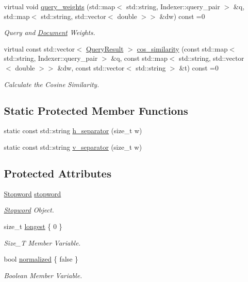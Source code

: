 \begin{DoxyCompactItemize}
virtual void \hyperlink{class_indexer_a74819336b6d9883483c09349ebdf43b8}{query\+\_\+weights} (std\+::map$<$ std\+::string, Indexer\+::query\+\_\+pair $>$ \&q, std\+::map$<$ std\+::string, std\+::vector$<$ double $>$$>$ \&dw) const =0
\begin{DoxyCompactList}\small\item\em Query and \hyperlink{class_document}{Document} Weights. \end{DoxyCompactList}\item 
virtual const std\+::vector$<$ \hyperlink{class_query_result}{Query\+Result} $>$ \hyperlink{class_indexer_a52bcf307b7fea4f3c6e7b440bc60d2fe}{cos\+\_\+similarity} (const std\+::map$<$ std\+::string, Indexer\+::query\+\_\+pair $>$ \&q, const std\+::map$<$ std\+::string, std\+::vector$<$ double $>$$>$ \&dw, const std\+::vector$<$ std\+::string $>$ \&t) const =0
\begin{DoxyCompactList}\small\item\em Calculate the Cosine Similarity. \end{DoxyCompactList}\end{DoxyCompactItemize}
\subsection*{Static Protected Member Functions}
\begin{DoxyCompactItemize}
\item 
static const std\+::string \hyperlink{class_indexer_adee34c99c25edcfd4a2b2ae6fe06c3cc}{h\+\_\+separator} (size\+\_\+t w)
\item 
static const std\+::string \hyperlink{class_indexer_ab8eadc78458b58c256a70208ea927d55}{v\+\_\+separator} (size\+\_\+t w)
\end{DoxyCompactItemize}
\subsection*{Protected Attributes}
\begin{DoxyCompactItemize}
\item 
\hyperlink{class_stopword}{Stopword} \hyperlink{class_indexer_af6f4a98f2cd0bb95f22203902ed2349d}{stopword}
\begin{DoxyCompactList}\small\item\em \hyperlink{class_stopword}{Stopword} Object. \end{DoxyCompactList}\item 
size\+\_\+t \hyperlink{class_indexer_a605caf73d13945418d628d740468d86d}{longest} \{ 0 \}
\begin{DoxyCompactList}\small\item\em Size\+\_\+T Member Variable. \end{DoxyCompactList}\item 
bool \hyperlink{class_indexer_a1345c9d490613f7b3a823ade15d7f68c}{normalized} \{ false \}
\begin{DoxyCompactList}\small\item\em Boolean Member Variable. \end{DoxyCompactList}\end{DoxyCompactItemize}

